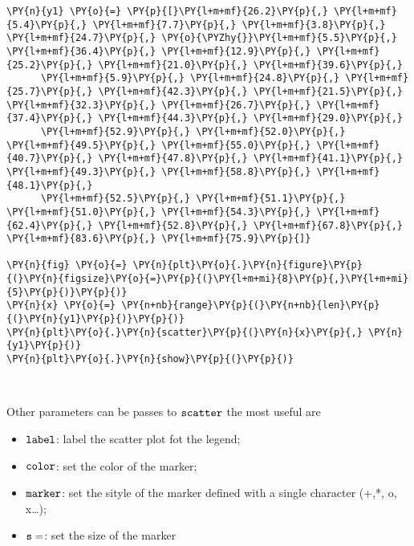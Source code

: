     \begin{tcolorbox}[breakable, size=fbox, boxrule=1pt, pad at break*=1mm,colback=cellbackground, colframe=cellborder]
\begin{Verbatim}[commandchars=\\\{\}]
\PY{n}{y1} \PY{o}{=} \PY{p}{[}\PY{l+m+mf}{26.2}\PY{p}{,} \PY{l+m+mf}{5.4}\PY{p}{,} \PY{l+m+mf}{7.7}\PY{p}{,} \PY{l+m+mf}{3.8}\PY{p}{,} \PY{l+m+mf}{24.7}\PY{p}{,} \PY{o}{\PYZhy{}}\PY{l+m+mf}{5.5}\PY{p}{,} \PY{l+m+mf}{36.4}\PY{p}{,} \PY{l+m+mf}{12.9}\PY{p}{,} \PY{l+m+mf}{25.2}\PY{p}{,} \PY{l+m+mf}{21.0}\PY{p}{,} \PY{l+m+mf}{39.6}\PY{p}{,} 
      \PY{l+m+mf}{5.9}\PY{p}{,} \PY{l+m+mf}{24.8}\PY{p}{,} \PY{l+m+mf}{25.7}\PY{p}{,} \PY{l+m+mf}{42.3}\PY{p}{,} \PY{l+m+mf}{21.5}\PY{p}{,} \PY{l+m+mf}{32.3}\PY{p}{,} \PY{l+m+mf}{26.7}\PY{p}{,} \PY{l+m+mf}{37.4}\PY{p}{,} \PY{l+m+mf}{44.3}\PY{p}{,} \PY{l+m+mf}{29.0}\PY{p}{,} 
      \PY{l+m+mf}{52.9}\PY{p}{,} \PY{l+m+mf}{52.0}\PY{p}{,} \PY{l+m+mf}{49.5}\PY{p}{,} \PY{l+m+mf}{55.0}\PY{p}{,} \PY{l+m+mf}{40.7}\PY{p}{,} \PY{l+m+mf}{47.8}\PY{p}{,} \PY{l+m+mf}{41.1}\PY{p}{,} \PY{l+m+mf}{49.3}\PY{p}{,} \PY{l+m+mf}{58.8}\PY{p}{,} \PY{l+m+mf}{48.1}\PY{p}{,} 
      \PY{l+m+mf}{52.5}\PY{p}{,} \PY{l+m+mf}{51.1}\PY{p}{,} \PY{l+m+mf}{51.0}\PY{p}{,} \PY{l+m+mf}{54.3}\PY{p}{,} \PY{l+m+mf}{62.4}\PY{p}{,} \PY{l+m+mf}{52.8}\PY{p}{,} \PY{l+m+mf}{67.8}\PY{p}{,} \PY{l+m+mf}{83.6}\PY{p}{,} \PY{l+m+mf}{75.9}\PY{p}{]}

\PY{n}{fig} \PY{o}{=} \PY{n}{plt}\PY{o}{.}\PY{n}{figure}\PY{p}{(}\PY{n}{figsize}\PY{o}{=}\PY{p}{(}\PY{l+m+mi}{8}\PY{p}{,}\PY{l+m+mi}{5}\PY{p}{)}\PY{p}{)}
\PY{n}{x} \PY{o}{=} \PY{n+nb}{range}\PY{p}{(}\PY{n+nb}{len}\PY{p}{(}\PY{n}{y1}\PY{p}{)}\PY{p}{)}
\PY{n}{plt}\PY{o}{.}\PY{n}{scatter}\PY{p}{(}\PY{n}{x}\PY{p}{,} \PY{n}{y1}\PY{p}{)}
\PY{n}{plt}\PY{o}{.}\PY{n}{show}\PY{p}{(}\PY{p}{)}
\end{Verbatim}
\end{tcolorbox}

    \begin{center}
    \end{center}
    { \hspace*{\fill} \\}
    
    Other parameters can be passes to \(\tt{scatter}\) the most useful are

\begin{itemize}
\tightlist
\item
  \(\tt{label}\): label the scatter plot fot the legend;
\item
  \(\tt{color}\): set the color of the marker;
\item
  \(\tt{marker}\): set the sityle of the marker defined with a single
  character (+,*, o, x\ldots{});
\item
  \(\tt{s=}\): set the size of the marker
\end{itemize}

